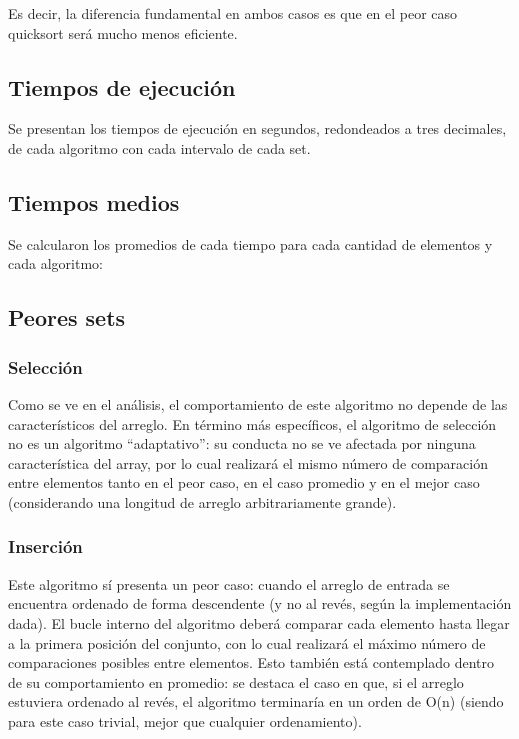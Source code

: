 \documentclass[titlepage,a4paper]{article}
\begin{document}
Es decir, la diferencia fundamental en ambos casos es que en el peor caso quicksort será mucho menos eficiente.

\subsection{Tiempos de ejecución}

Se presentan los tiempos de ejecución en segundos, redondeados a tres decimales, de cada algoritmo con cada intervalo de cada set.


\subsection{Tiempos medios}

Se calcularon los promedios de cada tiempo para cada cantidad de elementos y cada algoritmo:


\subsection{Peores sets}

\subsubsection{Selección}

Como se ve en el análisis, el comportamiento de este algoritmo no depende de las característicos del arreglo. En término más específicos, el algoritmo de selección no es un algoritmo “adaptativo”: su conducta no se ve afectada por ninguna característica del array, por lo cual realizará el mismo número de comparación entre elementos tanto en el peor caso, en el caso promedio y en el mejor caso (considerando una longitud de arreglo arbitrariamente grande).

\subsubsection{Inserción}

Este algoritmo sí presenta un peor caso: cuando el arreglo de entrada se encuentra ordenado de forma descendente (y no al revés, según la implementación dada). El bucle interno del algoritmo deberá comparar cada elemento hasta llegar a la primera posición del conjunto, con lo cual realizará el máximo número de comparaciones posibles entre elementos. Esto también está contemplado dentro de su comportamiento en promedio: se destaca el caso en que, si el arreglo estuviera ordenado al revés, el algoritmo terminaría en un orden de O(n) (siendo para este caso trivial, mejor que cualquier ordenamiento).
\end{document}
